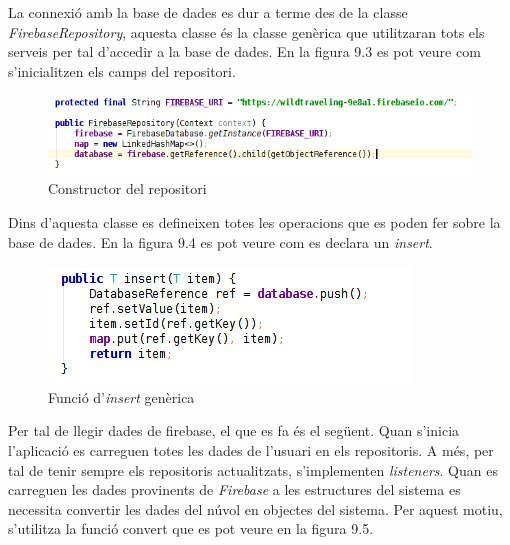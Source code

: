 \begin{itemize}
La connexió amb la base de dades es dur a terme des de la classe \textit{FirebaseRepository}, aquesta classe és la classe genèrica que utilitzaran tots els serveis per tal d'accedir a la base de dades. En la figura 9.3 es pot veure com s'inicialitzen els camps del repositori.

\clearpage

\begin{figure}[!h]
\centering
\includegraphics[scale=0.8]{Figures/db1.png}
\caption{Constructor del repositori}
\end{figure}

Dins d'aquesta classe es defineixen totes les operacions que es poden fer sobre la base de dades. En la figura 9.4 es pot veure com es declara un \textit{insert}.

\begin{figure}[!h]
\centering
\includegraphics[scale=0.8]{Figures/db2.png}
\caption{Funció d'\textit{insert} genèrica}
\end{figure}

Per tal de llegir dades de firebase, el que es fa és el següent. Quan s'inicia l'aplicació es carreguen totes les dades de l'usuari en els repositoris. A més, per tal de tenir sempre els repositoris actualitzats, s'implementen \textit{listeners}. Quan es carreguen les dades provinents de \textit{Firebase} a les estructures del sistema es necessita convertir les dades del núvol en objectes del sistema. Per aquest motiu, s'utilitza la funció convert que es pot veure en la figura 9.5.


\end{itemize}
